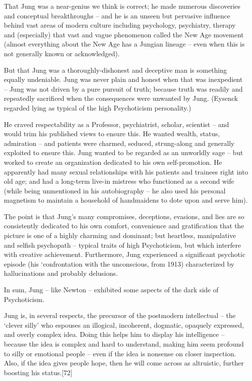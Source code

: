 \documentclass[
]{book}
\begin{document}
That Jung was a near-genius we think is correct; he made numerous discoveries and conceptual breakthroughs -- and he is an unseen but pervasive influence behind vast areas of modern culture including psychology, psychiatry, therapy and (especially) that vast and vague phenomenon called the New Age movement (almost everything about the New Age has a Jungian lineage -- even when this is not generally known or acknowledged).

But that Jung was a thoroughly-dishonest and deceptive man is something equally undeniable. Jung was never plain and honest when that was inexpedient -- Jung was not driven by a pure pursuit of truth; because truth was readily and repeatedly sacrificed when the consequences were unwanted by Jung. (Eysenck regarded lying as typical of the high Psychoticism personality.)

He craved respectability as a Professor, psychiatrist, scholar, scientist -- and would trim his published views to ensure this. He wanted wealth, status, admiration -- and patients were charmed, seduced, strung-along and generally exploited to ensure this. Jung wanted to be regarded as an unworldly sage -- but worked to create an organization dedicated to his own self-promotion. He apparently had many sexual relationships with his patients and trainees right into old age; and had a long-term live-in mistress who functioned as a second wife (while being unmentioned in his autobiography -- he also used his personal magnetism to maintain a household of handmaidens to dote upon and serve him).

The point is that Jung's many compromises, deceptions, evasions, and lies are so consistently dedicated to his own comfort, convenience and gratification that the picture is one of a highly charming and dominant; but heartless, manipulative and selfish psychopath -- typical traits of high Psychoticism, but which interfere with creative achievement. Furthermore, Jung experienced a significant psychotic episode (his `confrontation with the unconscious, from 1913) characterized by hallucinations and probably delusions.

In sum, Jung -- like Newton -- exhibited some aspects of the dark side of Psychoticism.

Jung is, in several respects, the precursor of the postmodern intellectual -- the `clever silly' who espouses an illogical, incoherent, dogmatic, opaquely expressed, and overly complex idea. Doing this helps him to display his intelligence -- because the idea is complex and hard to understand, making him seem profound to silly or emotional people -- even if the idea is nonsense on closer inspection. Also, if the idea gives people hope, then he will come across as altruistic, further boosting his status.{[}72{]}
\end{document}
